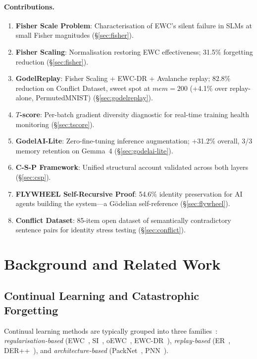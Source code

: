 \documentclass[12pt]{article}
\newcommand{\tscore}{$T$\nobreakdash-score\xspace}
\newcommand{\godelreplay}{GodelReplay\xspace}
\begin{document}
\paragraph{Contributions.}
\begin{enumerate}
  \item \textbf{Fisher Scale Problem}: Characterisation of EWC's silent failure
        in SLMs at small Fisher magnitudes (\S\ref{sec:fisher}).
  \item \textbf{Fisher Scaling}: Normalisation restoring EWC effectiveness;
        31.5\% forgetting reduction (\S\ref{sec:fisher}).
  \item \textbf{\godelreplay}: Fisher Scaling + EWC-DR + Avalanche replay;
        82.8\% reduction on Conflict Dataset, sweet spot at $\mathit{mem}{=}200$
        (+4.1\% over replay-alone, PermutedMNIST) (\S\ref{sec:godelreplay}).
  \item \textbf{\tscore{}}: Per-batch gradient diversity diagnostic for
        real-time training health monitoring (\S\ref{sec:tscore}).
  \item \textbf{GodelAI-Lite}: Zero-fine-tuning inference augmentation; +31.2\%
        overall, 3/3 memory retention on Gemma~4 (\S\ref{sec:godelai-lite}).
  \item \textbf{C-S-P Framework}: Unified structural account validated across
        both layers (\S\ref{sec:csp}).
  \item \textbf{FLYWHEEL Self-Recursive Proof}: 54.6\% identity preservation
        for AI agents building the system---a G\"{o}delian self-reference
        (\S\ref{sec:flywheel}).
  \item \textbf{Conflict Dataset}: 85-item open dataset of semantically
        contradictory sentence pairs for identity stress testing (\S\ref{sec:conflict}).
\end{enumerate}

\section{Background and Related Work}
\label{sec:related}

\subsection{Continual Learning and Catastrophic Forgetting}

Continual learning methods are typically grouped into three
families~\citep{parisi2019continual}:
\emph{regularisation-based} (EWC~\citep{kirkpatrick2017overcoming},
SI~\citep{zenke2017continual}, oEWC~\citep{schwarz2018progress},
EWC-DR~\citep{ewcdr2026}),
\emph{replay-based} (ER~\citep{rolnick2019experience},
DER++~\citep{buzzega2020dark}), and
\emph{architecture-based} (PackNet~\citep{mallya2018packnet},
PNN~\citep{rusu2016progressive}).
\end{document}
